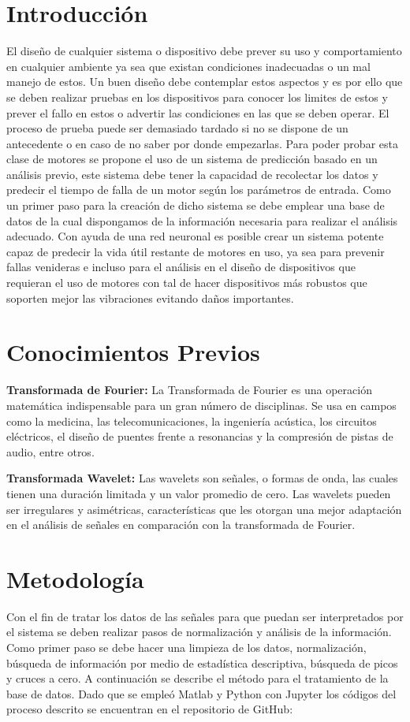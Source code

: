 \documentclass[11pt,a4paper]{article}
\begin{document}
\section{Introducción}
El diseño de cualquier sistema o dispositivo debe prever su uso y comportamiento en cualquier ambiente ya sea que existan condiciones inadecuadas o un mal manejo de estos. Un buen diseño debe contemplar estos aspectos y es por ello que se deben realizar pruebas en los dispositivos para conocer los limites de estos y prever el fallo en estos o advertir las condiciones en las que se deben operar. El proceso de prueba puede ser demasiado tardado si no se dispone de un antecedente o en caso de no saber por donde empezarlas. Para poder probar esta clase de motores se propone el uso de un sistema de predicción basado en un análisis previo, este sistema debe tener la capacidad de recolectar los datos y predecir el tiempo de falla de un motor según los parámetros de entrada. Como un primer paso para la creación de dicho sistema se debe emplear una base de datos de la cual dispongamos de la información necesaria para realizar el análisis adecuado. Con ayuda de una red neuronal es posible crear un sistema potente capaz de predecir la vida útil restante de motores en uso, ya sea para prevenir fallas venideras e incluso para el análisis en el diseño de dispositivos que requieran el uso de motores con tal de hacer dispositivos más robustos que soporten mejor las vibraciones evitando daños importantes.
\section{Conocimientos Previos}
\textbf{Transformada de Fourier:} La Transformada de Fourier es una operación matemática indispensable para un gran número de disciplinas. Se usa en campos como la medicina, las telecomunicaciones, la ingeniería acústica, los circuitos eléctricos, el diseño de puentes frente a resonancias y la compresión de pistas de audio, entre otros.

\textbf{Transformada Wavelet:} Las wavelets son señales, o formas de onda, las cuales tienen una duración limitada y un valor promedio de cero. Las wavelets pueden ser irregulares y asimétricas, características que les otorgan una mejor adaptación en el análisis de señales en comparación con la transformada de Fourier.\cite{intar}
\section{Metodología}
Con el fin de tratar los datos de las señales para que puedan ser interpretados por el sistema se deben realizar pasos de normalización y análisis de la información. Como primer paso se debe hacer una limpieza de los datos, normalización, búsqueda de información por medio de estadística descriptiva, búsqueda de picos y cruces a cero. A continuación se describe el método para el tratamiento de la base de datos. Dado que se empleó Matlab y Python con Jupyter los códigos del proceso descrito se encuentran en el repositorio de GitHub: \url{}
\end{document}
